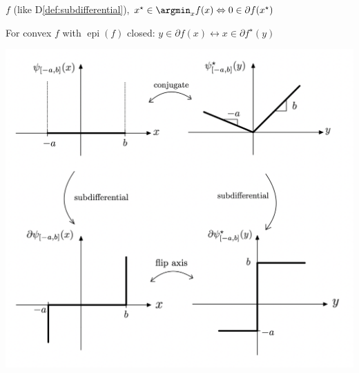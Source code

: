 \begin{proposition}[]
	$f$ (like D\ref{def:subdifferential}),
	$x^\star\in\argmin_x f(x)
		\Leftrightarrow
		0 \in\partial f(x^\star)$
\end{proposition}

\begin{proposition}
	For convex $f$ with $\operatorname{epi}(f)$ closed:
	$y \in \partial f(x) \leftrightarrow x \in \partial f^\star(y)$
\end{proposition}

%

\includegraphics[width=\columnwidth]{images/conjugate_subdiff.png}
